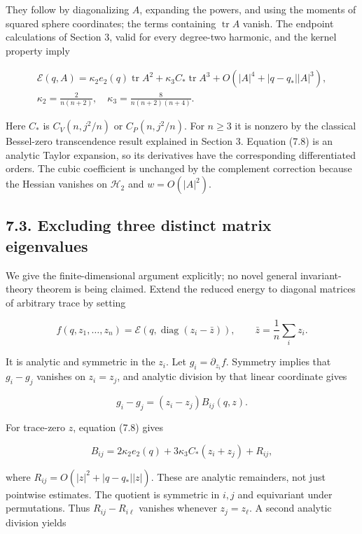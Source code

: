 \documentclass[11pt]{article}
\begin{document}
They follow by diagonalizing \(A\), expanding the powers, and using the
moments of squared sphere coordinates; the terms containing
\(\operatorname{tr}A\) vanish. The endpoint calculations of Section 3,
valid for every degree-two harmonic, and the kernel property imply

\[
\begin{gathered}
\mathscr E(q,A)=\kappa_2 e_2(q)\operatorname{tr}A^2
+\kappa_3 C_*\operatorname{tr}A^3
+O(|A|^4+|q-q_*||A|^3),\\
\kappa_2=\frac2{n(n+2)},\quad
\kappa_3=\frac8{n(n+2)(n+4)}.
\end{gathered}
\tag{7.8}
\]

Here \(C_*\) is \(C_V(n,j^2/n)\) or \(C_P(n,j^2/n)\). For \(n\ge3\) it
is nonzero by the classical Bessel-zero transcendence result explained
in Section 3. Equation (7.8) is an analytic Taylor expansion, so its
derivatives have the corresponding differentiated orders. The cubic
coefficient is unchanged by the complement correction because the
Hessian vanishes on \(\mathcal H_2\) and \(w=O(|A|^2)\).

\subsection{7.3. Excluding three distinct matrix
eigenvalues}\label{excluding-three-distinct-matrix-eigenvalues}

We give the finite-dimensional argument explicitly; no novel general
invariant-theory theorem is being claimed. Extend the reduced energy to
diagonal matrices of arbitrary trace by setting

\[
f(q,z_1,\ldots,z_n)=\mathscr E(q,\operatorname{diag}(z_i-\bar z)),
\qquad \bar z=\frac1n\sum_i z_i.
\tag{7.9}
\]

It is analytic and symmetric in the \(z_i\). Let
\(g_i=\partial_{z_i}f\). Symmetry implies that \(g_i-g_j\) vanishes on
\(z_i=z_j\), and analytic division by that linear coordinate gives

\[
g_i-g_j=(z_i-z_j)B_{ij}(q,z).
\tag{7.10}
\]

For trace-zero \(z\), equation (7.8) gives

\[
B_{ij}=2\kappa_2e_2(q)+3\kappa_3C_*(z_i+z_j)+R_{ij},
\tag{7.11}
\]

where \(R_{ij}=O(|z|^2+|q-q_*||z|)\). These are analytic remainders, not
just pointwise estimates. The quotient is symmetric in \(i,j\) and
equivariant under permutations. Thus \(R_{ij}-R_{i\ell}\) vanishes
whenever \(z_j=z_\ell\). A second analytic division yields
\end{document}
